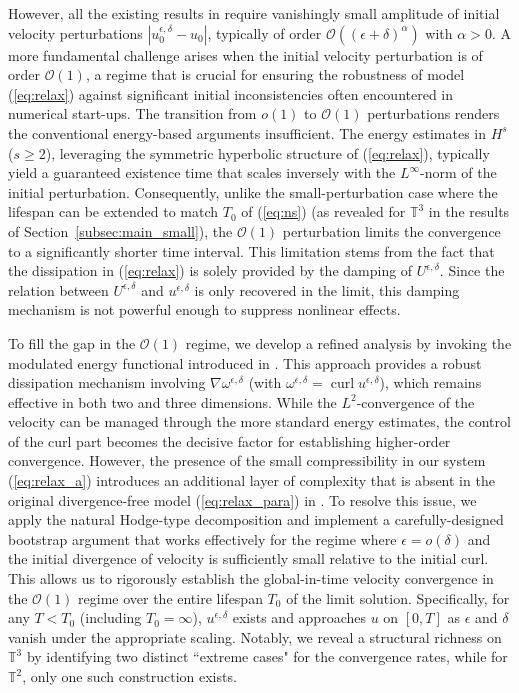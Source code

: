 \documentclass[reqno,10pt]{amsart}
\theoremstyle{definition}
\theoremstyle{remark}
\numberwithin{equation}{section}
\DeclareMathOperator{\curl}{curl}
\begin{document}
However, all the existing results in \cite{HRYZ25} require vanishingly small amplitude of initial velocity perturbations $|u^{\epsilon,\delta}_0-u_0|$, typically of order $\mathcal O((\epsilon+\delta)^\alpha)$ with $\alpha>0$. A more fundamental challenge arises when the initial velocity perturbation is of order $\mathcal O(1)$, a regime that is crucial for ensuring the robustness of model (\ref{eq:relax}) against significant initial inconsistencies often encountered in numerical start-ups. The transition from $o(1)$ to $\mathcal O(1)$ perturbations renders the conventional energy-based arguments insufficient. The energy estimates in $H^s$ ($s\ge 2$), leveraging the symmetric hyperbolic structure of (\ref{eq:relax}), typically yield a guaranteed existence time that scales inversely with the $L^\infty$-norm of the initial perturbation. Consequently, unlike the small-perturbation case where the lifespan can be extended to match $T_0$ of (\ref{eq:ns}) (as revealed for $\mathbb{T}^3$ in the results of Section~\ref{subsec:main_small}), the $\mathcal O(1)$ perturbation limits the convergence to a significantly shorter time interval. This limitation stems from the fact that the dissipation in (\ref{eq:relax}) is solely provided by the damping of $U^{\epsilon,\delta}$. Since the relation between $U^{\epsilon,\delta}$ and $u^{\epsilon,\delta}$ is only recovered in the limit, this damping mechanism is not powerful enough to suppress nonlinear effects.

To fill the gap in the $\mathcal O(1)$ regime, we develop a refined analysis by invoking the modulated energy functional introduced in \cite{Brenier2003}. This approach provides a robust dissipation mechanism involving $\nabla \omega^{\epsilon,\delta}$ (with $\omega^{\epsilon,\delta} = \curl u^{\epsilon,\delta}$), which remains effective in both two and three dimensions. While the $L^2$-convergence of the velocity can be managed through the more standard energy estimates, the control of the curl part becomes the decisive factor for establishing higher-order convergence. However, the presence of the small compressibility in our system (\ref{eq:relax_a}) introduces an additional layer of complexity that is absent in the original divergence-free model (\ref{eq:relax_para}) in \cite{Brenier2003}. To resolve this issue, we apply the natural Hodge-type decomposition and implement a carefully-designed bootstrap argument that works effectively for the regime where $\epsilon = o(\delta)$ and the initial divergence of velocity is sufficiently small relative to the initial curl. This allows us to rigorously establish the global-in-time velocity convergence in the $\mathcal O(1)$ regime over the entire lifespan $T_0$ of the limit solution. Specifically, for any $T < T_0$ (including $T_0 = \infty$), $u^{\epsilon,\delta}$ exists and approaches $u$ on $[0, T]$ as $\epsilon$ and $\delta$ vanish under the appropriate scaling. Notably, we reveal a structural richness on $\mathbb T^3$ by identifying two distinct ``extreme cases" for the convergence rates, while for $\mathbb T^2$, only one such construction exists.
\end{document}
